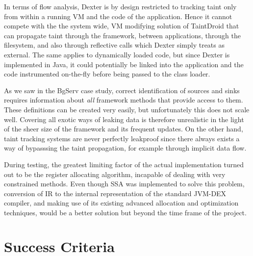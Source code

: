 \documentclass[12pt,twoside,notitlepage]{report}
\begin{document}
In terms of flow analysis, Dexter is by design restricted to tracking taint only from within a running VM and the code of the application. Hence it cannot compete with the the system wide, VM modifying solution of TaintDroid that can propagate taint through the framework, between applications, through the filesystem, and also through reflective calls which Dexter simply treats as external. The same applies to dynamically loaded code, but since Dexter is implemented in Java, it could potentially be linked into the application and the code instrumented on-the-fly before being passed to the class loader.

As we saw in the BgServ case study, correct identification of sources and sinks requires information about \emph{all} framework methods that provide access to them. These definitions can be created very easily, but unfortunately this does not scale well. Covering all exotic ways of leaking data is therefore unrealistic in the light of the sheer size of the framework and its frequent updates. On the other hand, taint tracking systems are never perfectly leakproof since there always exists a way of bypasssing the taint propagation, for example through implicit data flow.

During testing, the greatest limiting factor of the actual implementation turned out to be the register allocating algorithm, incapable of dealing with very constrained methods. Even though SSA was implemented to solve this problem, conversion of IR to the internal representation of the standard JVM-DEX compiler, and making use of its existing advanced allocation and optimization techniques, would be a better solution but beyond the time frame of the project.

\section{Success Criteria}
\end{document}
